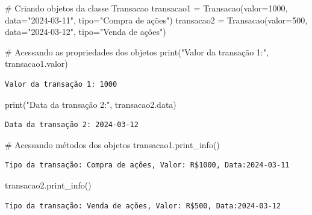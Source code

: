 \documentclass[
  portuguese,
  letterpaper,
  DIV=11,
  numbers=noendperiod]{scrreprt}
\newenvironment{Shaded}{\begin{snugshade}}{\end{snugshade}}
\newcommand{\BuiltInTok}[1]{\textcolor[rgb]{0.00,0.23,0.31}{#1}}
\newcommand{\CommentTok}[1]{\textcolor[rgb]{0.37,0.37,0.37}{#1}}
\newcommand{\DecValTok}[1]{\textcolor[rgb]{0.68,0.00,0.00}{#1}}
\newcommand{\NormalTok}[1]{\textcolor[rgb]{0.00,0.23,0.31}{#1}}
\newcommand{\OperatorTok}[1]{\textcolor[rgb]{0.37,0.37,0.37}{#1}}
\newcommand{\StringTok}[1]{\textcolor[rgb]{0.13,0.47,0.30}{#1}}
\theoremstyle{definition}
\theoremstyle{remark}
\begin{document}
\begin{Shaded}
\begin{Highlighting}[]
\CommentTok{\# Criando objetos da classe Transacao}
\NormalTok{transacao1 }\OperatorTok{=}\NormalTok{ Transacao(valor}\OperatorTok{=}\DecValTok{1000}\NormalTok{, data}\OperatorTok{=}\StringTok{"2024{-}03{-}11"}\NormalTok{, tipo}\OperatorTok{=}\StringTok{"Compra de ações"}\NormalTok{)}
\NormalTok{transacao2 }\OperatorTok{=}\NormalTok{ Transacao(valor}\OperatorTok{=}\DecValTok{500}\NormalTok{, data}\OperatorTok{=}\StringTok{"2024{-}03{-}12"}\NormalTok{, tipo}\OperatorTok{=}\StringTok{"Venda de ações"}\NormalTok{)}

\CommentTok{\# Acessando as propriedades dos objetos}
\BuiltInTok{print}\NormalTok{(}\StringTok{"Valor da transação 1:"}\NormalTok{, transacao1.valor)}
\end{Highlighting}
\end{Shaded}

\begin{verbatim}
Valor da transação 1: 1000
\end{verbatim}

\begin{Shaded}
\begin{Highlighting}[]
\BuiltInTok{print}\NormalTok{(}\StringTok{"Data da transação 2:"}\NormalTok{, transacao2.data)}
\end{Highlighting}
\end{Shaded}

\begin{verbatim}
Data da transação 2: 2024-03-12
\end{verbatim}

\begin{Shaded}
\begin{Highlighting}[]
\CommentTok{\# Acessando métodos dos objetos}
\NormalTok{transacao1.print\_info()}
\end{Highlighting}
\end{Shaded}

\begin{verbatim}
Tipo da transação: Compra de ações, Valor: R$1000, Data:2024-03-11
\end{verbatim}

\begin{Shaded}
\begin{Highlighting}[]
\NormalTok{transacao2.print\_info()}
\end{Highlighting}
\end{Shaded}

\begin{verbatim}
Tipo da transação: Venda de ações, Valor: R$500, Data:2024-03-12
\end{verbatim}
\end{document}
